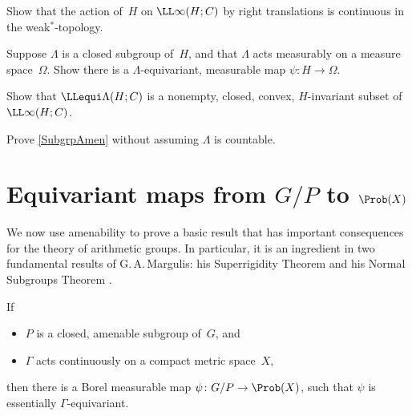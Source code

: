 \begin{exercises}

\item \label{HContOnL(H;C)}
Show that the action of~$H$ on $\LL\infty(H;C)$ by right translations is continuous in the weak$^*$-topology.

\item \label{GammaEquiEx}
  Suppose $\Lambda$ is a closed subgroup of~$H$, and that $\Lambda$ acts measurably on a measure
space~$\Omega$. Show there is a $\Lambda$-equivariant,
measurable map $\psi \colon H \to \Omega$.

\item \label{Equi(H;C)ClosedConvex}
Show that $\LLequi\Lambda(H;C)$ is a nonempty, closed, convex, $H$-invariant subset of $\LL\infty(H;C)$.

\item \label{SubgrpIsAmen(NotDiscrete)}
Prove \cref{SubgrpAmen} without assuming $\Lambda$ is countable.

\end{exercises}




 
 
 \section{Equivariant maps from \texorpdfstring{$G/P$}{G/P} to \texorpdfstring{$\Prob(X)$}{Prob(X)}}\label{AmenEquiMapSect}

We now use amenability to prove a basic result that has important consequences for the theory of arithmetic groups. In particular, it is an ingredient in two fundamental results of G.\,A.\,Margulis: his Superrigidity Theorem  and his Normal Subgroups Theorem .

\begin{prop} \label{G/amen->Meas(X)}
 If 
\noprelistbreak
 \begin{itemize}
 \item $P$ is a closed, amenable subgroup of~$G$,
 and
 \item $\Gamma$ acts continuously on a compact metric space~$X$,
 \end{itemize}
 then there is a Borel measurable map $\psi \colon G/P \to
\Prob(X)$, such that $\psi$ is essentially $\Gamma$-equivariant.
 \end{prop}

